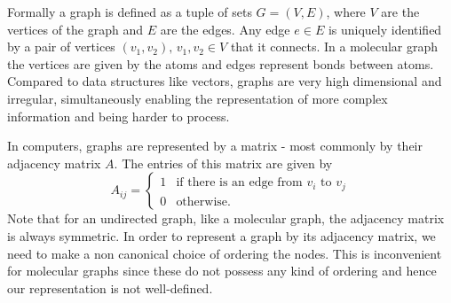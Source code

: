 Formally a graph is defined as a tuple of sets $G = (V,E)$, where $V$ are the vertices of the graph and $E$ are the edges. Any edge $e \in E$ is uniquely identified by a pair of vertices $(v_1, v_2), \, v_1, v_2 \in V$ that it connects. In a molecular graph the vertices are given by the atoms and edges represent bonds between atoms. Compared to data structures like vectors, graphs are very high dimensional and irregular, simultaneously enabling the representation of more complex information and being harder to process.

In computers, graphs are represented by a matrix - most commonly by their adjacency matrix $A$. The entries of this matrix are given by 
\begin{equation}
A_{ij} = 
\begin{cases}
1 & \text{if there is an edge from } v_i \text{ to } v_j \\
0 & \text{otherwise.}
\end{cases}
\end{equation}
Note that for an undirected graph, like a molecular graph, the adjacency matrix is always symmetric. In order to represent a graph by its adjacency matrix, we need to make a non canonical choice of ordering the nodes. This is inconvenient for molecular graphs since these do not possess any kind of ordering and hence our representation is not well-defined. 

